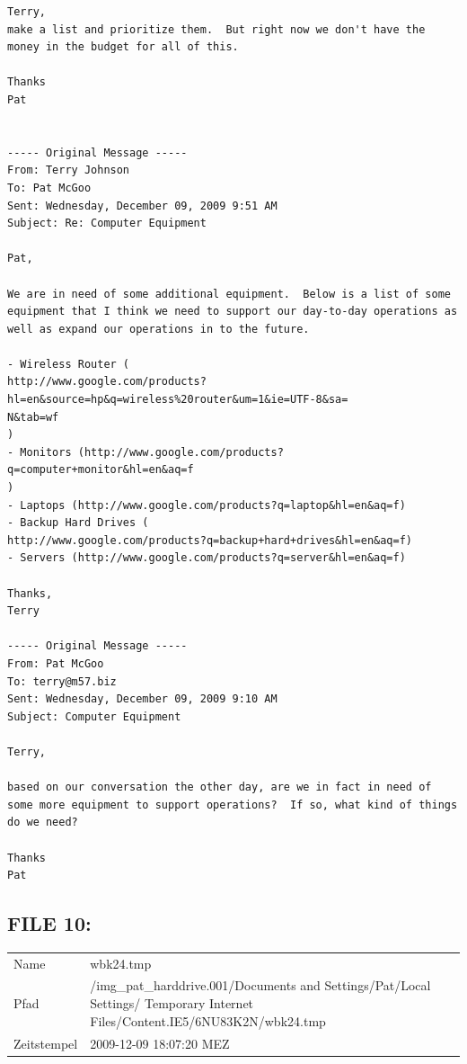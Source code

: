 \begin{lstlisting}
Terry,
make a list and prioritize them.  But right now we don't have the 
money in the budget for all of this.

Thanks
Pat


----- Original Message -----
From: Terry Johnson
To: Pat McGoo
Sent: Wednesday, December 09, 2009 9:51 AM
Subject: Re: Computer Equipment

Pat,

We are in need of some additional equipment.  Below is a list of some
equipment that I think we need to support our day-to-day operations as
well as expand our operations in to the future.

- Wireless Router (
http://www.google.com/products?hl=en&source=hp&q=wireless%20router&um=1&ie=UTF-8&sa=
N&tab=wf
)
- Monitors (http://www.google.com/products?q=computer+monitor&hl=en&aq=f
)
- Laptops (http://www.google.com/products?q=laptop&hl=en&aq=f)
- Backup Hard Drives (
http://www.google.com/products?q=backup+hard+drives&hl=en&aq=f)
- Servers (http://www.google.com/products?q=server&hl=en&aq=f)

Thanks,
Terry

----- Original Message -----
From: Pat McGoo
To: terry@m57.biz
Sent: Wednesday, December 09, 2009 9:10 AM
Subject: Computer Equipment

Terry,

based on our conversation the other day, are we in fact in need of
some more equipment to support operations?  If so, what kind of things
do we need? 

Thanks
Pat
\end{lstlisting}

\subsection{FILE 10:}
\label{sec:pat_emails_10}	

\begin{table}[htb]
	\begin{tabular}{p{2cm} p{13.5cm}}
		Name & wbk24.tmp\\
		Pfad & /img_pat_harddrive.001/Documents and Settings/Pat/Local Settings/ Temporary Internet Files/Content.IE5/6NU83K2N/wbk24.tmp\\
		Zeitstempel & 2009-12-09 18:07:20 MEZ
	\end{tabular}
\end{table}	


